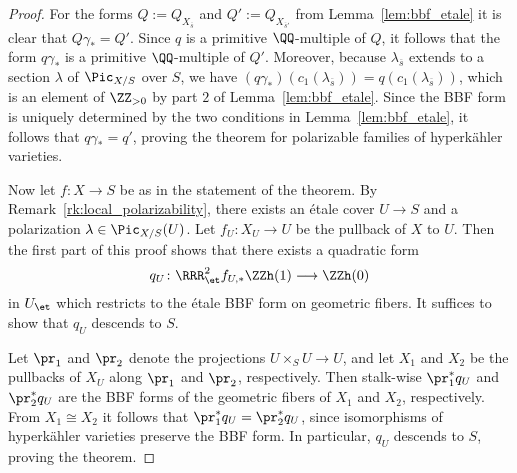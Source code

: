 \begin{proof}
For the forms $Q := Q_{X_{\overline{s}}}$ and $Q' := Q_{X_{\overline{s}'}}$ from Lemma~\ref{lem:bbf_etale} it is clear that $Q \gamma_* = Q'$. Since $q$ is a primitive $\QQ$-multiple of $Q$, it follows that the form $q\gamma_*$ is a primitive $\QQ$-multiple of $Q'$. Moreover, because $\lambda_{\overline{s}}$ extends to a section $\lambda$ of $\Pic_{X/S}$ over $S$, we have $(q\gamma_*)(c_1(\lambda_{\overline{s}})) = q(c_1(\lambda_{\overline{s}}))$, which is an element of $\ZZ_{> 0}$ by part $2$ of Lemma~\ref{lem:bbf_etale}. Since the BBF form is uniquely determined by the two conditions in Lemma~\ref{lem:bbf_etale}, it follows that $q \gamma_* = q'$, proving the theorem for polarizable families of hyperk\"ahler varieties.

Now let $f\colon X \rightarrow S$ be as in the statement of the theorem. By Remark~\ref{rk:local_polarizability}, there exists an \'etale cover $U \rightarrow S$ and a polarization $\lambda \in \Pic_{X/S}(U)$. Let $f_U\colon X_U \rightarrow U$ be the pullback of $X$ to $U$. Then the first part of this proof shows that there exists a quadratic form
$$
q_{U}\colon \RRR_{\et}^2 f_{U,*} \ZZh(1) \longrightarrow \ZZh(0)
$$
in $U_{\et}$ which restricts to the \'etale BBF form on geometric fibers. It suffices to show that $q_U$ descends to $S$.

Let $\pr_1$ and $\pr_2$ denote the projections $U \times_S U \rightarrow U$, and let $X_1$ and $X_2$ be the pullbacks of $X_U$ along $\pr_1$ and $\pr_2$, respectively. Then stalk-wise $\pr_1^* q_U$ and $\pr_2^* q_U$ are the BBF forms of the geometric fibers of $X_1$ and $X_2$, respectively. From $X_1 \cong X_2$ it follows that $\pr_1^* q_U = \pr_2^* q_U$, since isomorphisms of hyperk\"ahler varieties preserve the BBF form. In particular, $q_U$ descends to $S$, proving the theorem.
\end{proof}

